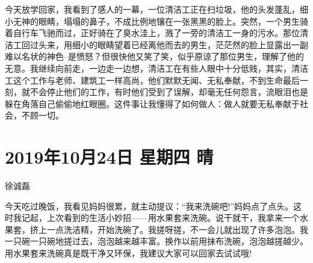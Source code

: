 今天放学回家，我看到了感人的一幕，一位清洁工正在扫垃圾，他的头发蓬乱，细小无神的眼睛，塌塌的鼻子，不成比例地镶在一张黑黑的脸上。突然，一个男生骑着自行车飞驰而过，正好骑在了臭水洼上，溅了一旁的清洁工一身的污水。那位清洁工回过头来，用细小的眼睛望着已经离他而去的男生，茫茫然的脸上显露出一副难以名状的神色--是愤怒？但很快他又笑了笑，似乎原谅了那位男生，理解了他的无意。我继续向前走，一边走一边想，清洁工在有些人眼中十分低贱，其实，清洁工这个工作与老师、建筑工一样高尚，他们默默无闻、无私奉献，不到生命最后一刻，就不会停止他们的工作，有时他们受到了误解，却毫无任何怨言，流眼泪也是躲在角落自己偷偷地红眼圈。这件事让我懂得了如何做人：做人就要无私奉献于社会，不顾一切。

\section{2019年10月24日 星期四 晴}

徐诚磊

今天吃过晚饭，我看见妈妈很累，就主动提议：``我来洗碗吧!''妈妈点了点头。这时我记起，上次看到的生活小妙招------用水果套来洗碗。说干就干，我拿来一个水果套，挤上一点洗洁精，开始洗碗了。我搓呀搓，不一会儿就出现了许多泡泡。我一只碗一只碗地搓过去，泡泡越来越丰富。换作以前用抹布洗碗，泡泡越搓越少。用水果套来洗碗真是既干净又环保，我建议大家可以回家去试试哦!

